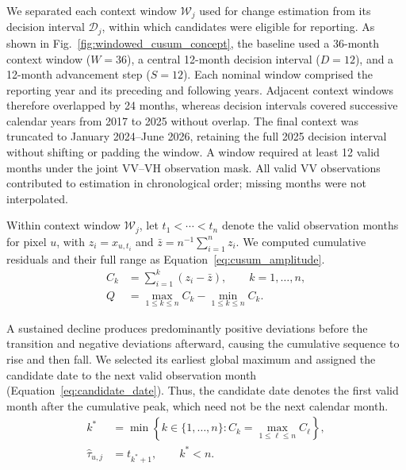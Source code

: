 We separated each context window $\mathcal{W}_j$ used for change estimation from its decision interval $\mathcal{D}_j$, within which candidates were eligible for reporting. As shown in Fig.~\ref{fig:windowed_cusum_concept}, the baseline used a 36-month context window ($W=36$), a central 12-month decision interval ($D=12$), and a 12-month advancement step ($S=12$). Each nominal window comprised the reporting year and its preceding and following years. Adjacent context windows therefore overlapped by 24 months, whereas decision intervals covered successive calendar years from 2017 to 2025 without overlap. The final context was truncated to January 2024--June 2026, retaining the full 2025 decision interval without shifting or padding the window. A window required at least 12 valid months under the joint VV--VH observation mask. All valid VV observations contributed to estimation in chronological order; missing months were not interpolated.

Within context window $\mathcal{W}_j$, let $t_1<\cdots<t_n$ denote the valid observation months for pixel $u$, with $z_i=x_{u,t_i}$ and $\bar z=n^{-1}\sum_{i=1}^{n}z_i$. We computed cumulative residuals and their full range as Equation~\eqref{eq:cusum_amplitude}.
\begin{equation}
    \begin{aligned}
        C_k &= \sum_{i=1}^{k}(z_i-\bar z),
        \qquad k=1,\ldots,n,\\
        Q &= \max_{1\leq k\leq n}C_k
             - \min_{1\leq k\leq n}C_k.
    \end{aligned}
    \label{eq:cusum_amplitude}
\end{equation}

A sustained decline produces predominantly positive deviations before the transition and negative deviations afterward, causing the cumulative sequence to rise and then fall. We selected its earliest global maximum and assigned the candidate date to the next valid observation month (Equation~\eqref{eq:candidate_date}). Thus, the candidate date denotes the first valid month after the cumulative peak, which need not be the next calendar month.
\begin{equation}
    \begin{aligned}
        k^* &=
        \min\left\{
            k\in\{1,\ldots,n\}:
            C_k=\max_{1\leq \ell\leq n}C_\ell
        \right\},\\
        \hat{\tau}_{u,j} &= t_{k^*+1},
        \qquad k^*<n.
    \end{aligned}
    \label{eq:candidate_date}
\end{equation}


